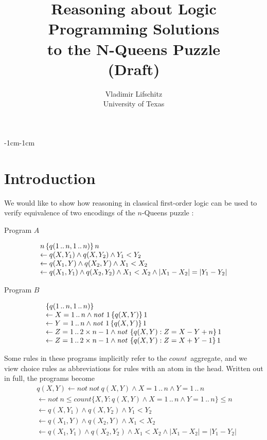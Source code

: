 \documentclass[11pt]{article}
\title{Reasoning about Logic Programming Solutions\\
  to the N-Queens Puzzle\\
  (Draft)}
\author{Vladimir Lifschitz\\ University of Texas}
\def\ar{\leftarrow}
\def\ba{\begin{array}}
\def\ea{\end{array}}
\newcommand{\co}{\ensuremath{\mathit{count}}}
\newcommand{\no}{\ensuremath{\mathit{not}}}
\begin{document}
\maketitle

\begin{adjustwidth}{-1cm}{-1cm}

\section{Introduction}
  
We would like to show how reasoning in classical first-order logic can
be used to verify equivalence of two encodings of the $n$-Queens
puzzle \cite[Tables~2 and~3]{geb11b}:
\medskip

\begin{center}Program $A$\end{center}
$$
\ba l
n\,\{ q(1\,..\,n,1\,..\,n) \}\, n\\
\ar q(X,Y_1) \land q(X,Y_2) \land Y_1 < Y_2\\
\ar q(X_1,Y) \land q(X_2,Y) \land X_1 < X_2\\
\ar q(X_1,Y_1) \land q(X_2,Y_2) \land X_1 < X_2 \land |X_1-X_2| = |Y_1-Y_2|
\ea
$$

\medskip
\begin{center}Program $B$\end{center}
$$\ba l
\{ q(1\,..\,n,1\,..\,n) \}\\
\ar X = 1\,..\,n \land \no\ 1\, \{ q(X,Y) \}\, 1\\
\ar Y = 1\,..\,n \land \no\ 1\, \{ q(X,Y) \}\, 1\\
\ar Z = 1\,..\,2\times n-1 \land \no\   \{ q(X,Y) : Z = X-Y+n \}\, 1\\
\ar Z = 1\,..\,2\times n-1 \land \no\   \{ q(X,Y) : Z = X+Y-1 \}\, 1\\
\ea
$$

\medskip
Some rules in these programs implicitly refer to the \co\ aggregate, and
we view choice rules as abbreviations for rules with an atom in
the head.  Written out in full, the programs become
\begin{align}
& q(X,Y) \ar \no\   \no\   q(X,Y) \land X = 1\,..\,n \land Y = 1\,..\,n	\label{a1}\\
& \ar \no\ n\leq  \co\{ X,Y : q(X,Y) \land X = 1\,..\,n \land Y = 1\,..\,n \}
  \leq n
  \label{a2}\\
& \ar q(X,Y_1) \land q(X,Y_2) \land Y_1 < Y_2\label{a3}\\
& \ar q(X_1,Y) \land q(X_2,Y) \land X_1 < X_2\label{a4}\\
& \ar q(X_1,Y_1) \land q(X_2,Y_2) \land X_1 < X_2 \land |X_1-X_2| = |Y_1-Y_2|
  \label{a5}
\end{align}


\end{adjustwidth}
\end{document}
